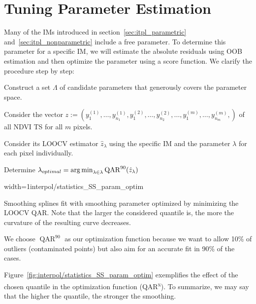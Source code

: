 \section{Tuning Parameter Estimation}{ \label{sec:itpl_param_est}
	Many of the {{IM}}s introduced in section~\ref{sec:itpl_parametric} and~\ref{sec:itpl_nonparametric} include a free parameter. To determine this parameter for a specific {{IM}}, we will estimate the absolute residuals using OOB estimation and then optimize the parameter using a score function. We clarify the procedure step by step:	
	\begin{Nenumerate}
		\item Construct a set $\Lambda$ of candidate parameters that generously covers the parameter space.
		\item Consider the vector $z:=(y_1^{(1)},\dots,y_{n_1}^{(1)},y_1^{(2)},\dots,y_{n_2}^{(2)},\dots,y_1^{(m)},\dots,y_{n_m}^{(m)},)$ of all NDVI TS for all $m$ pixels.
		\item Consider its LOOCV estimator $\hat z_\lambda$ using the specific IM and the parameter $\lambda$ for each pixel individually.
		\item Determine $\lambda_{optimal} = \operatorname*{arg\, min}_{\lambda\in\lambda}\operatorname{QAR}^{90}(\hat z_\lambda)$
	\end{Nenumerate}

	\begin{my_figure}[h]{width=1\textwidth}{interpol/statistics_SS_param_optim}
		\caption[Smoothing splines optimized by minimizing the given quantile of the absolute leave-one-out residuals]{Smoothing splines fit with smoothing parameter optimized by minimizing the LOOCV QAR. Note that the larger the considered quantile is, the more the curvature of the resulting curve decreases.}
		\label{fig:interpol/statistics_SS_param_optim}
	\end{my_figure}

	We choose $\operatorname{QAR}^{90}$ as our optimization function because we want to allow 10\% of outliers (contaminated points) but also aim for an accurate fit in 90\% of the cases.  
	
	Figure~\ref{fig:interpol/statistics_SS_param_optim} exemplifies the effect of the chosen quantile in the optimization function (QAR\textsuperscript{x}). To summarize, we may say that the higher the quantile, the stronger the smoothing. 
}


